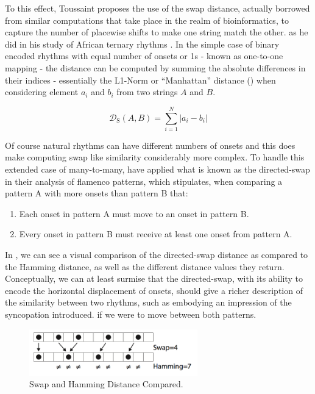 To this effect, Toussaint proposes the use of the swap distance, actually borrowed from similar computations that take place in the realm of bioinformatics, to capture the number of placewise shifts to make one string match the other. as he did in his study of African ternary rhythms \citep{Toussaint2003}. In the simple case of binary encoded rhythms with equal number of onsets or 1s - known as one-to-one mapping - the distance can be computed by summing the absolute differences in their indices \citep{Toussaint2016} - essentially the L1-Norm or ``Manhattan'' distance () when considering element $a_i$ and $b_i$ from two strings $A$ and $B$.

\begin{equation}
\label{eq:swap}
	\mathcal{D}_\mathrm{S}(A,B) = {\sum_{i=1}^{N}|a_i-b_i|}	
\end{equation}

Of course natural rhythms can have different numbers of onsets and this does make computing swap like similarity considerably more complex. To handle this extended case of many-to-many, \cite{Diaz-Banez2004} have applied what is known as the directed-swap in their analysis of flamenco patterns, which stipulates, when comparing a pattern A with more onsets than pattern B that:

\begin{enumerate}
	\item Each onset in pattern A must move to an onset in pattern B.
	\item Every onset in pattern B must receive at least one onset from pattern A.
\end{enumerate}

In , we can see a visual comparison of the directed-swap distance as compared to the Hamming distance, as well as the different distance values they return. Conceptually, we can at least surmise that the directed-swap, with its ability to encode the horizontal displacement of onsets, should give a richer description of the similarity between two rhythms, such as embodying an impression of the syncopation introduced. if we were to move between both patterns.

\begin{figure}
	\begin{center}
		\includegraphics[width=0.65\textwidth]{ch03_symbolic/figures/swap_vs_hamming.png}
	\end{center}
	\caption[Swap and Hamming Distance Compared.]{Swap and Hamming Distance Compared.}
	\label{fig:swapvshamming}
\end{figure}


